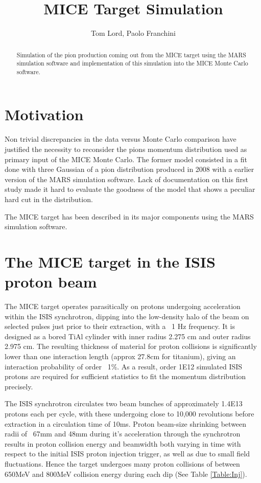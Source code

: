 \documentclass[a4paper,11pt]{article}
\title{MICE Target Simulation}
\author{Tom Lord, Paolo Franchini}
\begin{document}
\maketitle
\tableofcontents

\begin{abstract}
Simulation of the pion production coming out from the MICE target using the MARS simulation software and implementation of this simulation into the MICE Monte Carlo software.
\end{abstract}

\newpage

\section{Motivation}

Non trivial discrepancies in the data versus Monte Carlo comparison have justified the necessity to reconsider the pions momentum distribution used as primary input of the MICE Monte Carlo.
The former model consisted in a fit done with three Gaussian of a pion distribution produced in 2008 with a earlier version of the MARS simulation software. Lack of documentation on this first study made it hard to evaluate the goodness of the model that shows a peculiar hard cut in the distribution.

The MICE target has been described in its major components using the MARS simulation software.
\section{The MICE target in the ISIS proton beam}

The MICE target operates parasitically on protons undergoing acceleration within the ISIS synchrotron, dipping into the low-density halo of the beam on selected pulses just prior to their extraction, with a ~1 Hz frequency. It is designed as a bored TiAl cylinder with inner radius 2.275 cm and outer radius 2.975 cm. The resulting thickness of material for proton collisions is significantly lower than one interaction length (approx 27.8cm for titanium), giving an interaction probability of order ~1\%. As a result, order 1E12 simulated ISIS protons are required for sufficient statistics to fit the momentum distribution precisely. 

The ISIS synchrotron circulates two beam bunches of approximately 1.4E13 protons each per cycle, with these undergoing close to 10,000 revolutions before extraction in a circulation time of 10ms. Proton beam-size shrinking between radii of ~67mm and 48mm during it's acceleration through the synchrotron results in proton collision energy and beamwidth both varying in time with respect to the initial ISIS proton injection trigger, as well as due to small field fluctuations. Hence the target undergoes many proton collisions of between 650MeV and 800MeV collision energy during each dip (See Table \ref{Table:Inj}). 
\end{document}
